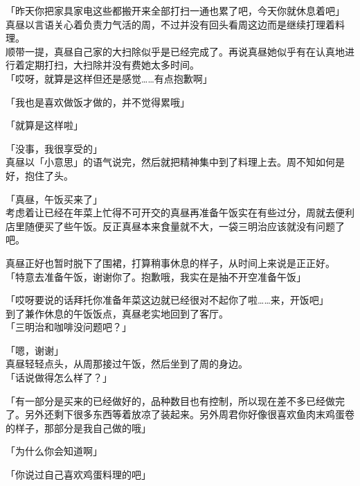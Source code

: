 「昨天你把家具家电这些都搬开来全部打扫一通也累了吧，今天你就休息着吧」\\

真昼以言语关心着负责力气活的周，不过并没有回头看周这边而是继续打理着料理。\\

顺带一提，真昼自己家的大扫除似乎是已经完成了。再说真昼她似乎有在认真地进行着定期打扫，大扫除并没有费她太多时间。\\

「哎呀，就算是这样但还是感觉……有点抱歉啊」

「我也是喜欢做饭才做的，并不觉得累哦」

「就算是这样啦」

「没事，我很享受的」\\

真昼以「小意思」的语气说完，然后就把精神集中到了料理上去。周不知如何是好，抱住了头。\\

\vspace{2\baselineskip}

「真昼，午饭买来了」\\

考虑着让已经在年菜上忙得不可开交的真昼再准备午饭实在有些过分，周就去便利店里随便买了些午饭。反正真昼本来食量就不大，一袋三明治应该就没有问题了吧。

真昼正好也暂时脱下了围裙，打算稍事休息的样子，从时间上来说是正正好。\\

「特意去准备午饭，谢谢你了。抱歉哦，我实在是抽不开空准备午饭」

「哎呀要说的话拜托你准备年菜这边就已经很对不起你了啦……来，开饭吧」\\

到了兼作休息的午饭饭点，真昼老实地回到了客厅。\\

「三明治和咖啡没问题吧？」

「嗯，谢谢」\\

真昼轻轻点头，从周那接过午饭，然后坐到了周的身边。\\

「话说做得怎么样了？」

「有一部分是买来的已经做好的，品种数目也有控制，所以现在差不多已经做完了。另外还剩下很多东西等着放凉了装起来。另外周君你好像很喜欢鱼肉末鸡蛋卷的样子，那部分是我自己做的哦」

「为什么你会知道啊」

「你说过自己喜欢鸡蛋料理的吧」\\

